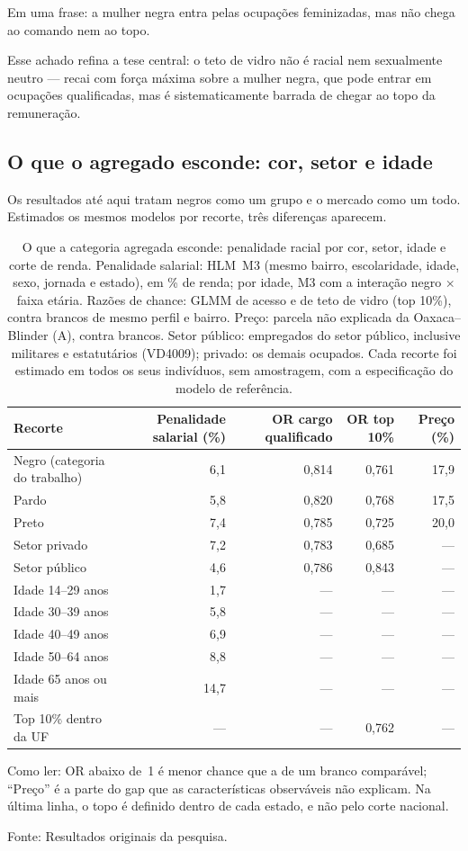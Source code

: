 \documentclass[11pt, a4paper, oneside]{article}
\begin{document}
Em uma frase: a mulher negra entra pelas ocupações feminizadas, mas não chega ao
comando nem ao topo.

Esse achado refina a tese central: o teto de vidro não é racial nem sexualmente neutro
--- recai com força máxima sobre a mulher negra, que pode {entrar} em ocupações
qualificadas, mas é sistematicamente barrada de {chegar ao topo} da remuneração.


\subsection*{O que o agregado esconde: cor, setor e idade}
Os resultados até aqui tratam negros como um grupo e o mercado como um todo. Estimados os mesmos modelos por recorte, três diferenças aparecem.

\begin{table}[!ht]
\centering
\caption{O que a categoria agregada esconde: penalidade racial por cor, setor, idade e
corte de renda. Penalidade salarial: HLM~M3 (mesmo bairro, escolaridade, idade, sexo,
jornada e estado), em \% de renda; por idade, M3 com a interação negro $\times$ faixa
etária. Razões de chance: GLMM de acesso e de teto de vidro (top 10\%), contra brancos
de mesmo perfil e bairro. Preço: parcela não explicada da Oaxaca--Blinder (A), contra
brancos. Setor público: empregados do setor público, inclusive militares e estatutários
(VD4009); privado: os demais ocupados. Cada recorte foi estimado em todos os seus
indivíduos, sem amostragem, com a especificação do modelo de referência.}
\label{tab:heterogeneidade}
\begin{tabular}{lrrrr}
\toprule
Recorte & Penalidade salarial (\%) & OR cargo qualificado & OR top 10\% & Preço (\%) \\
\midrule
Negro (categoria do trabalho) & 6,1 & 0,814 & 0,761 & 17,9 \\
\quad Pardo & 5,8 & 0,820 & 0,768 & 17,5 \\
\quad Preto & 7,4 & 0,785 & 0,725 & 20,0 \\
Setor privado & 7,2 & 0,783 & 0,685 & --- \\
Setor público & 4,6 & 0,786 & 0,843 & --- \\
Idade 14--29 anos & 1,7 & --- & --- & --- \\
Idade 30--39 anos & 5,8 & --- & --- & --- \\
Idade 40--49 anos & 6,9 & --- & --- & --- \\
Idade 50--64 anos & 8,8 & --- & --- & --- \\
Idade 65 anos ou mais & 14,7 & --- & --- & --- \\
Top 10\% dentro da UF & --- & --- & 0,762 & --- \\
\bottomrule
\end{tabular}
\par\smallskip
\footnotesize{Como ler:} OR abaixo de~1 é menor chance que a de um branco
comparável; ``Preço'' é a parte do gap que as características observáveis não explicam.
Na última linha, o topo é definido dentro de cada estado, e não pelo corte nacional.
\par\smallskip\footnotesize Fonte: Resultados originais da pesquisa.
\end{table}
\end{document}
